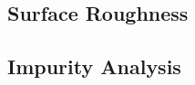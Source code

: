 \subsection{Surface Roughness}

\subsection{Impurity Analysis}



\begin{comment}
\section{LPE - Hall, FTIR, SIMS}

\todo{Have to add SIMS to both Method chapter and Experimental details chapter (Why is SIMS used?).} \Ac{sims} profiles of \ce{Na}, \ce{Al}, \ce{Si}, \ce{K}, \ce{Fe}, \ce{Ni}, \ce{Cu}, and \ce{Pb} from two different locations on sample LPE422 are shown in Fig.~\ref{fig:sims_lpe422}. The measurements show that \ce{Na}, \ce{Al}, \ce{Si}, \ce{K}, and \ce{Fe} are found at the interface between the substrate and the grown layer as peak concentrations. \ce{Ni}, \ce{Cu}, and \ce{Pb}, with detection limits of \SI{1e14}{}, \SI{2e14}{}, and \SI{2e13}{\atom\centi\metre^{-3}} respectively, were not detected throughout the \ce{HgCdTe} film and \ce{CdZnTe} substrate.

\ce{Si} and \ce{K} were detected in neither the \ce{HgCdTe} film nor in the \ce{CdZnTe} substrate. \todo{Where does the Si and K come from?}

\ce{Na} and \ce{Al} were not detected in the \ce{HgCdTe} film, but were detected in the \ce{CdZnTe} substrate. \todo{Why doesn't Al diffuse into the layer? Why is there a minimum in the Na concentration right after the peak before it grows into the substrate?}

\ce{Fe} was detected throughout both the \ce{HgCdTe} layer and the \ce{CdZnTe} substrate. Higher \ce{Fe} concentration was detected with a peak \ce{Fe} concentration likely at the interface of \ce{HgCdTe} and \ce{CdZnTe}. This higher concentration of \ce{Fe} was found between a depth of \SI{\sim 13}{\micro\metre} and \SI{23}{\micro\metre} for the first measurement, and between a depth of \SI{\sim 16}{\micro\metre} and \SI{23}{\micro\metre} for the second measurement. The \ce{Fe} peak stands out \todo{... explanation of the different shapes: Why does the \ce{Fe} concentration have a wide concentration peak? And why is it in both the substrate and the layer?} \todo{Group 1A and 1B diffuse faster than other?}


\end{comment}
